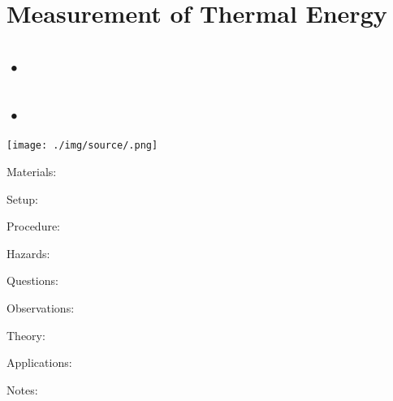 \section{Measurement of Thermal Energy}

\begin{multicols}{2}


\section*{•}




\subsection{•}

\begin{center}
\texttt{[image: ./img/source/.png]}
\end{center}

\begin{description*}
\item[Materials:]{}
\item[Setup:]{}
\item[Procedure:]{}
\item[Hazards:]{}
\item[Questions:]{}
\item[Observations:]{}
\item[Theory:]{}
\item[Applications:]{}
\item[Notes:]{}
\end{description*}



\end{multicols}

\pagebreak